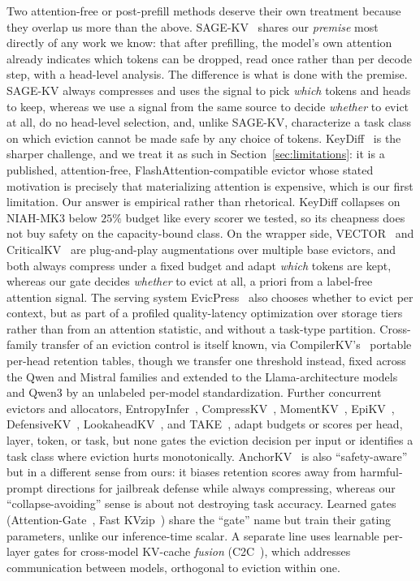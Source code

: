 Two attention-free or post-prefill methods deserve their own treatment
because they overlap us more than the above. SAGE-KV~\citep{sagekv} shares
our \emph{premise} most directly of any work we know: that after
prefilling, the model's own attention already indicates which tokens can
be dropped, read once rather than per decode step, with a head-level
analysis. The difference is what is done with the premise. SAGE-KV always
compresses and uses the signal to pick \emph{which} tokens and heads to
keep, whereas we use a signal from the same source to decide
\emph{whether} to evict at all, do no head-level selection, and, unlike
SAGE-KV, characterize a task class on which eviction cannot be made safe
by any choice of tokens. KeyDiff~\citep{keydiff} is the sharper challenge,
and we treat it as such in Section~\ref{sec:limitations}: it is a
published, attention-free, FlashAttention-compatible evictor whose stated
motivation is precisely that materializing attention is expensive, which
is our first limitation. Our answer is empirical rather than rhetorical.
KeyDiff collapses on NIAH-MK3 below $25\%$ budget like every scorer we
tested, so its cheapness does not buy safety on the capacity-bound class.
On the wrapper side, VECTOR~\citep{arxiv260523258} and
CriticalKV~\citep{arxiv250203805} are plug-and-play augmentations over
multiple base evictors, and both always compress under a fixed budget and
adapt \emph{which} tokens are kept, whereas our gate decides
\emph{whether} to evict at all, a priori from a label-free attention
signal. The serving system EvicPress~\citep{arxiv251214946} also chooses
whether to evict per context, but as part of a profiled quality-latency
optimization over storage tiers rather than from an attention statistic,
and without a task-type partition. Cross-family transfer of an eviction
control is itself known, via CompilerKV's~\citep{arxiv260208686} portable
per-head retention tables, though we transfer one threshold instead,
fixed across the Qwen and Mistral families and extended to the
Llama-architecture models and Qwen3 by an unlabeled per-model
standardization. Further concurrent evictors and allocators,
EntropyInfer~\citep{arxiv260609508}, CompressKV~\citep{arxiv260624467},
MomentKV~\citep{arxiv260601563}, EpiKV~\citep{EPIkv-arxiv},
DefensiveKV~\citep{defensive-kv-iclr2026},
LookaheadKV~\citep{arxiv260310899}, and TAKE~\citep{hu2026take}, adapt
budgets or scores per head, layer, token, or task, but none gates the
eviction decision per input or identifies a task class where eviction
hurts monotonically. AnchorKV~\citep{arxiv260617872} is also
``safety-aware'' but in a different sense from ours: it biases retention
scores away from harmful-prompt directions for jailbreak defense while
always compressing, whereas our ``collapse-avoiding'' sense is about not
destroying task accuracy. Learned gates
(Attention-Gate~\citep{zeng2025incontextkvcacheevictionllms}, Fast
KVzip~\citep{arxiv260117668}) share the ``gate'' name but train their
gating parameters, unlike our inference-time scalar. A separate line uses
learnable per-layer gates for cross-model KV-cache \emph{fusion}
(C2C~\citep{arxiv251003215}), which addresses communication between
models, orthogonal to eviction within one.

